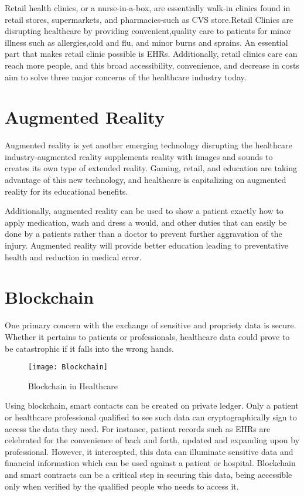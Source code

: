 \documentclass[12pt]{article}
\begin{document}
Retail health clinics, or a nurse-in-a-box, are essentially walk-in clinics found in retail stores, supermarkets, and pharmacies-such as CVS store.Retail Clinics are disrupting healthcare by providing convenient,quality care to patients for minor illness such as allergies,cold and flu, and minor burns and sprains. An essential part that makes retail clinic possible is EHRs. Additionally, retail clinics care can reach more people, and this broad accessibility, convenience, and decrease in costs aim to solve three major concerns of the healthcare industry today.              

\section{Augmented Reality}

Augmented reality is yet another emerging technology disrupting the healthcare industry-augmented reality supplements reality with images and sounds to creates its own type of extended reality. Gaming, retail, and education are taking advantage of this new technology, and healthcare is capitalizing on augmented reality for its educational benefits. 

Additionally, augmented reality can be used to show a patient exactly how to apply medication, wash and dress a would, and other duties that can easily be done by a patients rather than a doctor to prevent further aggravation of the injury. Augmented reality will provide better education leading to preventative health and reduction in medical error.

\section{Blockchain} 

One primary concern with the exchange of sensitive and propriety data is secure. Whether it pertains to patients or professionals, healthcare data could prove to be catastrophic if it falls into the wrong hands.

\begin{figure}[h]
\centering
\texttt{[image: Blockchain]}
\caption{Blockchain in Healthcare}
\end{figure}

Using blockchain, smart contacts can be created on private ledger. Only a patient or healthcare professional qualified to see such data can cryptographically sign to access the data they need. For instance, patient records such as EHRs are celebrated for the convenience of back and forth, updated and expanding upon by professional. However, it intercepted, this data can illuminate sensitive data and financial information which can be used against a patient or hospital. Blockchain and smart contracts can be a critical step in securing this data, being accessible only when verified by the qualified people who needs to access it. 
\end{document}
